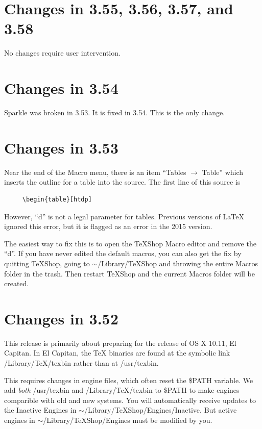 \documentclass[11pt, oneside]{amsart}
\begin{document}
\section{Changes in 3.55, 3.56, 3.57, and 3.58}

No changes require user intervention.

\section{Changes in 3.54}

Sparkle was broken in 3.53. It is fixed in 3.54. This is the only change.

\section{Changes in 3.53}

Near the end of the Macro menu, there is an item ``Tables $\rightarrow$ Table'' which inserts the
outline for a table into the source. The first line of this source is 
\begin{verbatim}
     \begin{table}[htdp]
\end{verbatim}

However, ``d'' is not a legal parameter for tables. Previous versions of LaTeX ignored this error, but it is flagged as an error in the 2015 version. 

The easiest way to fix this is to open the TeXShop Macro editor and remove the ``d''. If you have never edited the default macros,
you can also get the fix by quitting TeXShop, going to $\sim$/Library/TeXShop and
throwing the entire Macros folder in the trash. Then restart TeXShop and the current
Macros folder will be created.


\section{Changes in 3.52}


This release is primarily about preparing for the release of OS X 10.11, El Capitan. In El Capitan, the TeX binaries are found at the symbolic link /Library/TeX/texbin rather than at /usr/texbin.

This requires changes in engine files, which often reset the \$PATH variable. We add {\em both}
/usr/texbin and /Library/TeX/texbin to \$PATH to make engines comparible with old and new systems. You will automatically receive updates to the Inactive Engines in $\sim$/Library/TeXShop/Engines/Inactive. But active engines in $\sim$/Library/TeXShop/Engines must be modified
by you.
\end{document}
